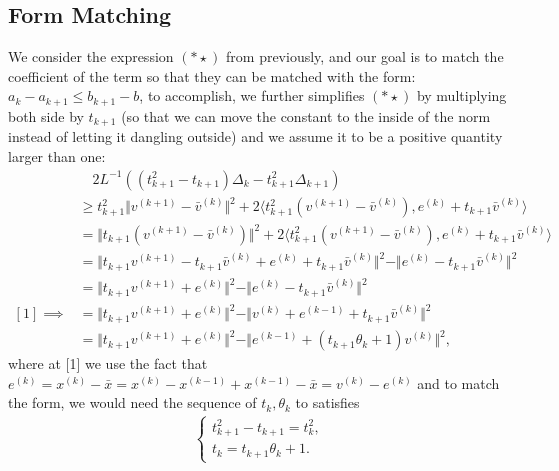\documentclass[]{article}
\theoremstyle{definition}
\begin{document}
    \subsection{Form Matching}
        We consider the expression $(*\star)$ from previously, and our goal is to match the coefficient of the term so that they can be matched with the form: $a_k - a_{k + 1}\le b_{k + 1} - b$, to accomplish, we further simplifies $(*\star)$ by multiplying both side by $t_{k + 1}$ (so that we can move the constant to the inside of the norm instead of letting it dangling outside) and we assume it to be a positive quantity larger than one: 
        \begin{align*}
            & \quad 2L^{-1}((t_{k + 1}^2 - t_{k + 1})\Delta_k - t_{k + 1}^2\Delta_{k + 1})
            \\
            & \ge  
            t_{k + 1}^2\Vert v^{(k + 1)} - \bar v^{(k)}\Vert^2 + 
            2\langle t_{k + 1}^2(v^{(k + 1)} - \bar v^{(k)}), e^{(k)} + t_{k + 1} \bar v^{(k)}\rangle
            \\
            &=
            \Vert t_{k + 1} (v^{(k + 1)} - \bar v^{(k)}) \Vert^2 + 
            2\langle t_{k + 1}^2(v^{(k + 1)} - \bar v^{(k)}), e^{(k)} + t_{k + 1}\bar v^{(k)}\rangle
            \\
            &=
            \Vert t_{k+1} v^{(k + 1)} - t_{k + 1}\bar v^{(k)} + e^{(k)} + t_{k + 1}\bar v^{(k)}\Vert^2
            - 
            \Vert e^{(k)} - t_{k + 1} \bar v^{(k)}\Vert^2
            \\
            &=
            \Vert 
                t_{k+1} v^{(k + 1)} + e^{(k)}
            \Vert^2
            - 
            \Vert e^{(k)} - t_{k + 1} \bar v^{(k)}\Vert^2
            \\
            [1]\implies
            & = 
            \Vert t_{k + 1}v^{(k + 1)} + e^{(k)}\Vert^2
            - 
            \Vert v^{(k)} + e^{(k - 1)} + t_{k + 1}\bar v^{(k)} \Vert^2
            \\
            & = 
            \Vert t_{k + 1}v^{(k + 1)} + e^{(k)}\Vert^2
            - 
            \Vert e^{(k - 1)} + (t_{k + 1}\theta_k + 1) v^{(k)} \Vert^2, 
            \tag{$\star \star$}
        \end{align*}
        where at [1] we use the fact that $e^{(k)}= x^{(k)} - \bar x = x^{(k)} - x^{(k - 1)}+ x^{(k - 1)} - \bar x = v^{(k)} - e^{(k)}$ and to match the form, we would need the sequence of $t_k, \theta_k$ to satisfies
        \begin{align*}
            \begin{cases}
                t^2_{k + 1} - t_{k + 1} = t_k^2,
                \\
                t_k = t_{k + 1}\theta_k + 1. 
            \end{cases}
            \tag{$\star **$}
        \end{align*}
\end{document}
